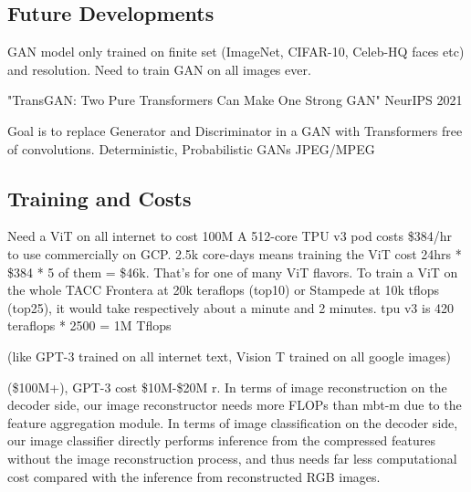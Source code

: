 \subsection{Future Developments}
GAN model only trained on finite set (ImageNet, CIFAR-10, Celeb-HQ faces etc) and resolution.
Need to train GAN on all images ever.

"TransGAN: Two Pure Transformers Can Make One Strong GAN" \citep{jiang2021transgan}
NeurIPS 2021

Goal is to replace Generator and Discriminator in a GAN with Transformers free of 
convolutions. 
Deterministic, Probabilistic
GANs
JPEG/MPEG

\subsection{Training and Costs}

Need a ViT on all internet to cost 100M
A 512-core TPU v3 pod costs \$384/hr to use commercially on GCP. 
2.5k core-days means training the ViT cost 24hrs * \$384 * 5 of them = \$46k. 
That's for one of many ViT flavors.
To train a ViT on the whole TACC Frontera at 20k teraflops (top10) or 
Stampede at 10k tflops (top25), it would take respectively about a minute and 2 minutes.
tpu v3 is 420 teraflops * 2500 = 1M Tflops

(like GPT-3 trained on all internet text, Vision T trained on all google images)

(\$100M+), GPT-3 cost \$10M-\$20M
r. In terms of image reconstruction on the decoder side, our image reconstructor needs more
FLOPs than mbt-m due to the feature aggregation module. In
terms of image classification on the decoder side, our image
classifier directly performs inference from the compressed
features without the image reconstruction process, and thus
needs far less computational cost compared with the inference from reconstructed RGB images.
